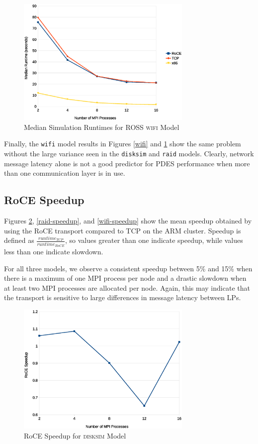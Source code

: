 \documentclass[11pt]{book}
\begin{document}
\begin{figure}
\centering
\includegraphics[width=0.75\textwidth]{wifi_median}
\caption{Median Simulation Runtimes for ROSS \textsc{wifi} Model}
\label{wifi-median}
\end{figure}

Finally, the \verb;wifi; model results in Figures \ref{wifi} and \ref{wifi-median} show
the same problem without the large variance seen in the \verb;disksim; and \verb;raid;
models.  Clearly, network message latency alone is not a good predictor for PDES
performance when more than one communication layer is in use.

\subsection{RoCE Speedup}

Figures \ref{disksim-speedup}, \ref{raid-speedup}, and \ref{wifi-speedup} show the mean
speedup obtained by using the RoCE transport compared to TCP on the ARM cluster.  Speedup
is defined as $\frac{runtime_{TCP}}{runtime_{RoCE}}$, so values greater than one indicate
speedup, while values less than one indicate slowdown.

For all three models, we observe a consistent speedup between 5\% and 15\% when there is a
maximum of one MPI process per node and a drastic slowdown when at least two MPI processes
are allocated per node.  Again, this may indicate that the transport is sensitive to large
differences in message latency between LPs.

\begin{figure}
\centering
\includegraphics[width=0.75\textwidth]{disksim_speedup}
\caption{RoCE Speedup for \textsc{disksim} Model}\label{disksim-speedup}
\end{figure}
\end{document}
